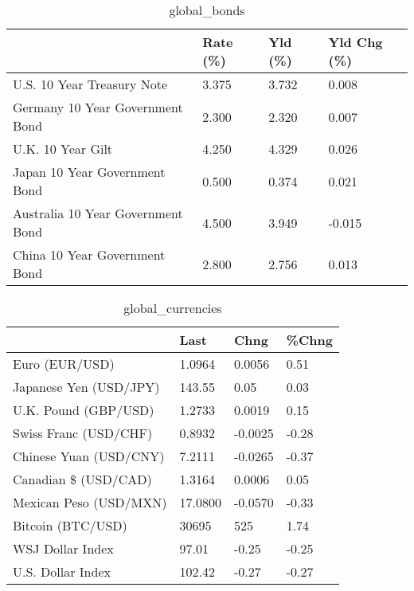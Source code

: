 \documentclass{article}%
\begin{document}
%


\begin{table}[htbp]%
\caption{global\_bonds}%
\centering%
\begin{adjustbox}{width=1\textwidth}%
\begin{tabular}{llll}
\toprule
                                  & Rate (\%) & Yld (\%) & Yld Chg (\%) \\
\midrule
       U.S. 10 Year Treasury Note &    3.375 &   3.732 &       0.008 \\
  Germany 10 Year Government Bond &    2.300 &   2.320 &       0.007 \\
                U.K. 10 Year Gilt &    4.250 &   4.329 &       0.026 \\
    Japan 10 Year Government Bond &    0.500 &   0.374 &       0.021 \\
Australia 10 Year Government Bond &    4.500 &   3.949 &      -0.015 \\
    China 10 Year Government Bond &    2.800 &   2.756 &       0.013 \\
\bottomrule
\end{tabular}
%
\end{adjustbox}%
\end{table}

%


\begin{table}[htbp]%
\caption{global\_currencies}%
\centering%
\begin{adjustbox}{width=1\textwidth}%
\begin{tabular}{llll}
\toprule
                       &    Last &    Chng & \%Chng \\
\midrule
        Euro (EUR/USD) &  1.0964 &  0.0056 &  0.51 \\
Japanese Yen (USD/JPY) &  143.55 &    0.05 &  0.03 \\
  U.K. Pound (GBP/USD) &  1.2733 &  0.0019 &  0.15 \\
 Swiss Franc (USD/CHF) &  0.8932 & -0.0025 & -0.28 \\
Chinese Yuan (USD/CNY) &  7.2111 & -0.0265 & -0.37 \\
  Canadian \$ (USD/CAD) &  1.3164 &  0.0006 &  0.05 \\
Mexican Peso (USD/MXN) & 17.0800 & -0.0570 & -0.33 \\
     Bitcoin (BTC/USD) &   30695 &     525 &  1.74 \\
      WSJ Dollar Index &   97.01 &   -0.25 & -0.25 \\
     U.S. Dollar Index &  102.42 &   -0.27 & -0.27 \\
\bottomrule
\end{tabular}
%
\end{adjustbox}%
\end{table}
\end{document}
